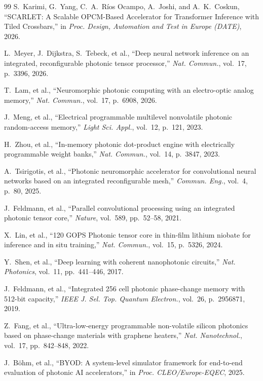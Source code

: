 \documentclass[11pt,a4paper]{report}
\begin{document}
\begin{thebibliography}{99}
S.~Karimi, G.~Yang, C.~A.~R\'ios Ocampo, A.~Joshi, and A.~K.~Coskun, ``SCARLET: A Scalable OPCM-Based Accelerator for Transformer Inference with Tiled Crossbars,'' in \textit{Proc. Design, Automation and Test in Europe (DATE)}, 2026.

L.~Meyer, J.~Dijkstra, S.~Tebeck, et al., ``Deep neural network inference on an integrated, reconfigurable photonic tensor processor,'' \textit{Nat. Commun.}, vol.~17, p.~3396, 2026.

T.~Lam, et al., ``Neuromorphic photonic computing with an electro-optic analog memory,'' \textit{Nat. Commun.}, vol.~17, p.~6908, 2026.

J.~Meng, et al., ``Electrical programmable multilevel nonvolatile photonic random-access memory,'' \textit{Light Sci. Appl.}, vol.~12, p.~121, 2023.

H.~Zhou, et al., ``In-memory photonic dot-product engine with electrically programmable weight banks,'' \textit{Nat. Commun.}, vol.~14, p.~3847, 2023.

A.~Tsirigotis, et al., ``Photonic neuromorphic accelerator for convolutional neural networks based on an integrated reconfigurable mesh,'' \textit{Commun. Eng.}, vol.~4, p.~80, 2025.

J.~Feldmann, et al., ``Parallel convolutional processing using an integrated photonic tensor core,'' \textit{Nature}, vol.~589, pp.~52--58, 2021.

X.~Lin, et al., ``120 GOPS Photonic tensor core in thin-film lithium niobate for inference and in situ training,'' \textit{Nat. Commun.}, vol.~15, p.~5326, 2024.

Y.~Shen, et al., ``Deep learning with coherent nanophotonic circuits,'' \textit{Nat. Photonics}, vol.~11, pp.~441--446, 2017.

J.~Feldmann, et al., ``Integrated 256 cell photonic phase-change memory with 512-bit capacity,'' \textit{IEEE J. Sel. Top. Quantum Electron.}, vol.~26, p.~2956871, 2019.

Z.~Fang, et al., ``Ultra-low-energy programmable non-volatile silicon photonics based on phase-change materials with graphene heaters,'' \textit{Nat. Nanotechnol.}, vol.~17, pp.~842--848, 2022.

J.~B\"ohm, et al., ``BYOD: A system-level simulator framework for end-to-end evaluation of photonic AI accelerators,'' in \textit{Proc. CLEO/Europe-EQEC}, 2025.
\end{thebibliography}
\end{document}
